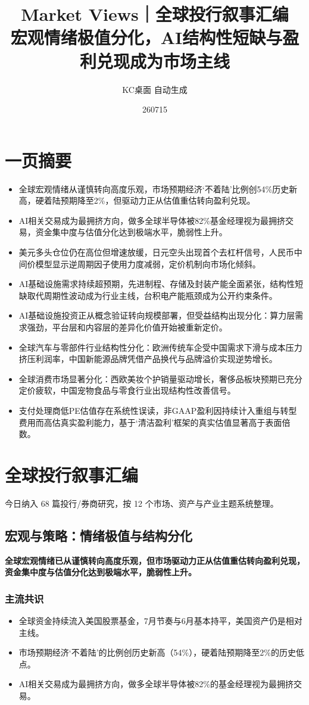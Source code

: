 \documentclass[11pt]{ctexart}
\title{\textbf{Market Views｜全球投行叙事汇编}\\[0.4em]{\large 宏观情绪极值分化，AI结构性短缺与盈利兑现成为市场主线}}
\author{KC桌面 自动生成}
\date{260715}
\begin{document}
\maketitle
\tableofcontents
\newpage
\section{一页摘要}
\begin{itemize}
  \item 全球宏观情绪从谨慎转向高度乐观，市场预期经济‘不着陆’比例创54\%历史新高，硬着陆预期降至2\%，但驱动力正从估值重估转向盈利兑现。
  \item AI相关交易成为最拥挤方向，做多全球半导体被82\%基金经理视为最拥挤交易，资金集中度与估值分化达到极端水平，脆弱性上升。
  \item 美元多头仓位仍在高位但增速放缓，日元空头出现首个去杠杆信号，人民币中间价模型显示逆周期因子使用力度减弱，定价机制向市场化倾斜。
  \item AI基础设施需求持续超预期，先进制程、存储及封装产能全面紧张，结构性短缺取代周期性波动成为行业主线，台积电产能瓶颈成为公开约束条件。
  \item AI基础设施投资正从概念验证转向规模部署，但受益结构出现分化：算力层需求强劲，平台层和内容层的差异化价值开始被重新定价。
  \item 全球汽车与零部件行业结构性分化：欧洲传统车企受中国需求下滑与成本压力挤压利润率，中国新能源品牌凭借产品换代与品牌溢价实现逆势增长。
  \item 全球消费市场显著分化：西欧美妆个护销量驱动增长，奢侈品板块预期已充分定价疲软，中国宠物食品与零食行业出现结构性改善信号。
  \item 支付处理商低PE估值存在系统性误读，非GAAP盈利因持续计入重组与转型费用而高估真实盈利能力，基于‘清洁盈利’框架的真实估值显著高于表面倍数。
\end{itemize}
\section{全球投行叙事汇编}
今日纳入 68 篇投行/券商研究，按 12 个市场、资产与产业主题系统整理。
\newpage
\subsection{宏观与策略：情绪极值与结构分化}
\textbf{全球宏观情绪已从谨慎转向高度乐观，但市场驱动力正从估值重估转向盈利兑现，资金集中度与估值分化达到极端水平，脆弱性上升。}
\subsubsection*{主流共识}
\begin{itemize}
  \item 全球资金持续流入美国股票基金，7月节奏与6月基本持平，美国资产仍是相对主线。
  \item 市场预期经济‘不着陆’的比例创历史新高（54\%），硬着陆预期降至2\%的历史低点。
  \item AI相关交易成为最拥挤方向，做多全球半导体被82\%的基金经理视为最拥挤交易。
\end{itemize}
\end{document}
